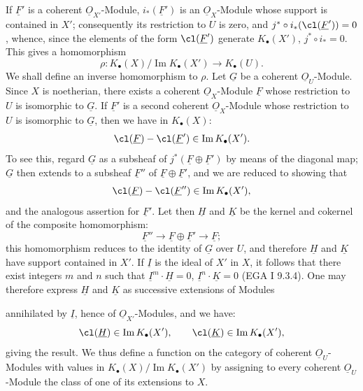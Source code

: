 If $\underline{F}'$ is a coherent $\underline{O}_{X'}$-Module, $i_*(\underline{F}')$ is an $\underline{O}_X$-Module whose support is contained in $X'$; consequently its restriction to $U$ is zero, and $j^*\circ i_*(\cl(\underline{F}'))=0$, whence, since the elements of the form $\cl(\underline{F}')$ generate $K_\bullet(X')$, $j^*\circ i_*=0$. This gives a homomorphism
\[
 \rho:K_\bullet(X)/\operatorname{Im}K_\bullet(X')\longrightarrow K_\bullet(U).
\]
We shall define an inverse homomorphism to $\rho$. Let $\underline{G}$ be a coherent $\underline{O}_U$-Module. Since $X$ is noetherian, there exists a coherent $\underline{O}_X$-Module $\underline{F}$ whose restriction to $U$ is isomorphic to $\underline{G}$. If $\underline{F}'$ is a second coherent $\underline{O}_X$-Module whose restriction to $U$ is isomorphic to $\underline{G}$, then we have in $K_\bullet(X)$:
\[
 \cl(\underline{F})-\cl(\underline{F}')\in \operatorname{Im}K_\bullet(X').
\]
To see this, regard $\underline{G}$ as a subsheaf of $j^*(\underline{F}\oplus \underline{F}')$ by means of the diagonal map; $\underline{G}$ then extends to a subsheaf $\underline{F}''$ of $\underline{F}\oplus \underline{F}'$, and we are reduced to showing that
\[
 \cl(\underline{F})-\cl(\underline{F}'')\in \operatorname{Im}K_\bullet(X'),
\]
and the analogous assertion for $\underline{F}'$. Let then $\underline{H}$ and $\underline{K}$ be the kernel and cokernel of the composite homomorphism:
\[
\underline{F}''\longrightarrow \underline{F}\oplus \underline{F}'\longrightarrow \underline{F} ;
\]
this homomorphism reduces to the identity of $\underline{G}$ over $U$, and therefore $\underline{H}$ and $\underline{K}$ have support contained in $X'$. If $\underline{I}$ is the ideal of $X'$ in $X$, it follows that there exist integers $m$ and $n$ such that $\underline{I}^m\cdot \underline{H}=0$, $\underline{I}^n\cdot \underline{K}=0$ (EGA I 9.3.4). One may therefore express $\underline{H}$ and $\underline{K}$ as successive extensions of Modules

%
annihilated by $\underline{I}$, hence of $\underline{O}_{X'}$-Modules, and we have:
\[
\cl(\underline{H})\in \operatorname{Im}K_\bullet(X'),\qquad
\cl(\underline{K})\in \operatorname{Im}K_\bullet(X'),
\]
giving the result. We thus define a function on the category of coherent $\underline{O}_U$-Modules with values in $K_\bullet(X)/\operatorname{Im}K_\bullet(X')$ by assigning to every coherent $\underline{O}_U$-Module the class of one of its extensions to $X$.

